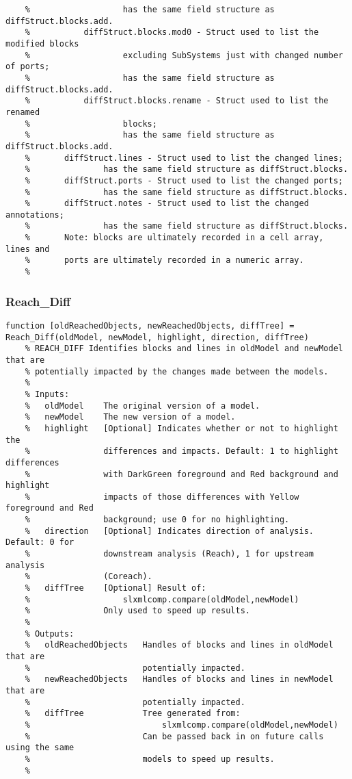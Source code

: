 \documentclass[12pt,letterpaper]{report}
\begin{document}
\begin{lstlisting}
    %                   has the same field structure as diffStruct.blocks.add.
    %           diffStruct.blocks.mod0 - Struct used to list the modified blocks
    %                   excluding SubSystems just with changed number of ports;
    %                   has the same field structure as diffStruct.blocks.add.
    %           diffStruct.blocks.rename - Struct used to list the renamed
    %                   blocks;
    %                   has the same field structure as diffStruct.blocks.add.
    %       diffStruct.lines - Struct used to list the changed lines;
    %               has the same field structure as diffStruct.blocks.
    %       diffStruct.ports - Struct used to list the changed ports;
    %               has the same field structure as diffStruct.blocks.
    %       diffStruct.notes - Struct used to list the changed annotations;
    %               has the same field structure as diffStruct.blocks.
    %       Note: blocks are ultimately recorded in a cell array, lines and
    %       ports are ultimately recorded in a numeric array.
    %
\end{lstlisting}
		\subsubsection{Reach\_Diff}
\begin{lstlisting}
function [oldReachedObjects, newReachedObjects, diffTree] = Reach_Diff(oldModel, newModel, highlight, direction, diffTree)
    % REACH_DIFF Identifies blocks and lines in oldModel and newModel that are 
    % potentially impacted by the changes made between the models.
    % 
    % Inputs:
    %   oldModel    The original version of a model.
    %   newModel    The new version of a model.
    %   highlight   [Optional] Indicates whether or not to highlight the
    %               differences and impacts. Default: 1 to highlight differences
    %               with DarkGreen foreground and Red background and highlight
    %               impacts of those differences with Yellow foreground and Red
    %               background; use 0 for no highlighting.
    %   direction   [Optional] Indicates direction of analysis. Default: 0 for
    %               downstream analysis (Reach), 1 for upstream analysis
    %               (Coreach).
    %   diffTree    [Optional] Result of:
    %                   slxmlcomp.compare(oldModel,newModel)
    %               Only used to speed up results.
    %
    % Outputs:
    %   oldReachedObjects   Handles of blocks and lines in oldModel that are
    %                       potentially impacted.
    %   newReachedObjects   Handles of blocks and lines in newModel that are
    %                       potentially impacted.
    %   diffTree            Tree generated from:
    %                           slxmlcomp.compare(oldModel,newModel)
    %                       Can be passed back in on future calls using the same
    %                       models to speed up results.
    % 
\end{lstlisting}
	
\end{document}
